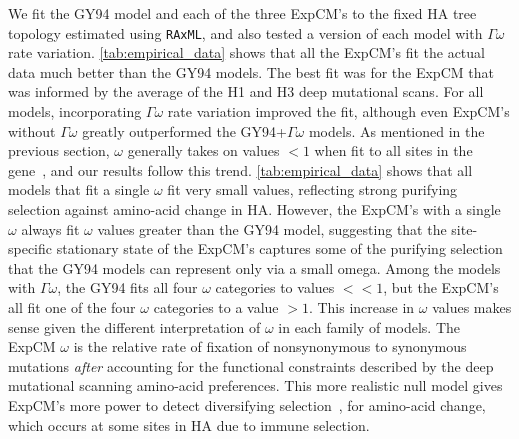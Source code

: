 \documentclass[11pt]{article}
\begin{document}
We fit the GY94 model and each of the three ExpCM's to the fixed HA tree topology estimated using \texttt{RAxML}, and also tested a version of each model with $\Gamma\omega$ rate variation.
\ref{tab:empirical_data} shows that all the ExpCM's fit the actual data much better than the GY94 models.
The best fit was for the ExpCM that was informed by the average of the H1 and H3 deep mutational scans.
For all models, incorporating $\Gamma\omega$ rate variation improved the fit, although even ExpCM's without $\Gamma\omega$ greatly outperformed the GY94+$\Gamma\omega$ models.
As mentioned in the previous section, $\omega$ generally takes on values $<1$ when fit to all sites in the gene~\citep{murrell2015gene}, and our results follow this trend. 
\ref{tab:empirical_data} shows that all models that fit a single $\omega$ fit very small values, reflecting strong purifying selection against amino-acid change in HA. 
However, the ExpCM's with a single $\omega$ always fit $\omega$ values greater than the GY94 model, suggesting that the site-specific stationary state of the ExpCM's captures some of the purifying selection that the GY94 models can represent only via a small omega.
Among the models with $\Gamma\omega$, the GY94 fits all four $\omega$ categories to values $<< 1$, but the ExpCM's all fit one of the four $\omega$ categories to a value $>1$.
This increase in $\omega$ values makes sense given the different interpretation of $\omega$ in each family of models. 
The ExpCM $\omega$ is the relative rate of fixation of nonsynonymous to synonymous mutations \textit{after} accounting for the functional constraints described by the deep mutational scanning amino-acid preferences.
This more realistic null model gives ExpCM's more power to detect diversifying selection~\citep{bloom2017identification, rodrigue2017detecting}, for amino-acid change, which occurs at some sites in HA due to immune selection.
\end{document}
